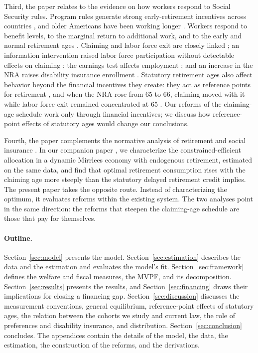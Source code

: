 Third, the paper relates to the evidence on how workers respond to Social Security rules. Program rules generate strong early-retirement incentives across countries \citep{gruber1998social,Gruberwise2002}, and older Americans have been working longer \citep{Coile2019}. Workers respond to benefit levels, to the marginal return to additional work, and to the early and normal retirement ages \citep{Coile2007future,Liebman2009labor,Mastrobuoni2009labor,Staubli2013does,Manoli2016nonparametric}. Claiming and labor force exit are closely linked \citep{shoven2017}; an information intervention raised labor force participation without detectable effects on claiming \citep{liebman2015would}; the earnings test affects employment \citep{gelber2020employment,Gelber2020estimating}; and an increase in the NRA raises disability insurance enrollment \citep{Duggan2007aching}. Statutory retirement ages also affect behavior beyond the financial incentives they create: they act as reference points for retirement \citep{behagel2012,seibold2021reference,Lalive2023how}, and when the NRA rose from 65 to 66, claiming moved with it while labor force exit remained concentrated at 65 \citep{Deshpande2024how}. Our reforms of the claiming-age schedule work only through financial incentives; we discuss how reference-point effects of statutory ages would change our conclusions.

Fourth, the paper complements the normative analysis of retirement and social insurance \citep{diamond1978model,cremer2004social,golosov2006designing,huggett2010well,Golosov2013optimal,hosseini2015adverse,nishiyama2007does,hosseini2019retirement}. In our companion paper \citep{NdiayeYu2026frot}, we characterize the constrained-efficient allocation in a dynamic Mirrlees economy with endogenous retirement, estimated on the same data, and find that optimal retirement consumption rises with the claiming age more steeply than the statutory delayed retirement credit implies. The present paper takes the opposite route. Instead of characterizing the optimum, it evaluates reforms within the existing system. The two analyses point in the same direction: the reforms that steepen the claiming-age schedule are those that pay for themselves.

\paragraph{Outline.} Section~\ref{sec:model} presents the model. Section~\ref{sec:estimation} describes the data and the estimation and evaluates the model's fit. Section~\ref{sec:framework} defines the welfare and fiscal measures, the MVPF, and its decomposition. Section~\ref{sec:results} presents the results, and Section~\ref{sec:financing} draws their implications for closing a financing gap. Section~\ref{sec:discussion} discusses the measurement conventions, general equilibrium, reference-point effects of statutory ages, the relation between the cohorts we study and current law, the role of preferences and disability insurance, and distribution. Section~\ref{sec:conclusion} concludes. The appendices contain the details of the model, the data, the estimation, the construction of the reforms, and the derivations.
